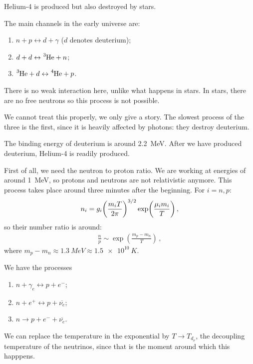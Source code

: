 \documentclass[main.tex]{subfiles}
\begin{document}
Helium-4 is produced but also destroyed by stars.

The main channels in the early universe are: 

\begin{enumerate}
    \item \(n+p \leftrightarrow d + \gamma \) (\(d\) denotes deuterium);
    \item \(d + d \leftrightarrow \ce{^{3}He} + n\);
    \item \(\ce{^{3}He} + d \leftrightarrow \ce{^{4}He} + p\).
\end{enumerate}

There is no weak interaction here, unlike what happens in stars.
In stars, there are no free neutrons so this process is not possible.

We cannot treat this properly, we only give a story.
The slowest process of the three is the first, since it is heavily affected by photons: they destroy deuterium.

The binding energy of deuterium is around \SI{2.2}{MeV}. After we have produced deuterium, Helium-4 is readily produced.

First of all, we need the neutron to proton ratio.
We are working at energies of around \SI{1}{MeV}, so protons and neutrons are not relativistic anymore.
This process takes place around three minutes after the beginning.
For \(i = n, p\): 
%
\begin{align}
  n_i = g_{i} \qty(\frac{m_i T}{2 \pi })^{3/2} \exp(\frac{\mu_i  m_i}{T})
\,,
\end{align}
%
so their number ratio is around: 
%
\begin{align}
  \frac{n}{p} \sim \exp(\frac{m_p- m_n}{T})
\,,
\end{align}
%
where \(m_p - m_n \approx \SI{1.3}{MeV} \approx \SI{1.5e10}{K}\).

We have the processes 
\begin{enumerate}
    \item \(n + \gamma _e \leftrightarrow p + e^{-}\);
    \item \(n + e^{+} \leftrightarrow p + \overline{\nu _e} \);
    \item \(n \rightarrow p + e^{-} + \overline{\nu _e} \).
\end{enumerate}

We can replace the temperature in the exponential by \(T \rightarrow T_{d_\nu }\), the decoupling temperature of the neutrinos, since that is the moment around which this happpens.
\end{document}
